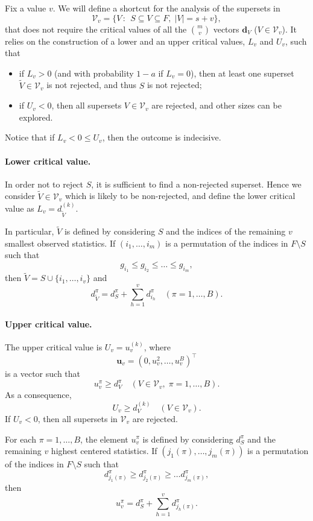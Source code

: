 \documentclass[11pt,a4paper,openright,twoside]{article}
\begin{document}
Fix a value $v$. We will define a shortcut for the analysis of the supersets in
\[\mathcal{V}_v=\{V\,:\,\;S\subseteq V\subseteq F,\; |V|=s+v\},\]
that does not require the critical values of all the $\binom{m}{v}$ vectors $\mathbf{d}_V$ ($V\in\mathcal{V}_v$). It relies on the construction of a lower and an upper critical values, $L_v$ and $U_v$, such that
\begin{itemize}
\item if $L_v> 0$ (and with probability $1-a$ if $L_v=0$), then at least one superset $\tilde{V}\in\mathcal{V}_v$ is not rejected, and thus $S$ is not rejected;
\item if $U_v<0$, then all supersets $V\in\mathcal{V}_v$ are rejected, and other sizes can be explored.
\end{itemize}
Notice that if $L_v< 0\leq U_v$, then the outcome is indecisive. 


\paragraph{Lower critical value.} In order not to reject $S$, it is sufficient to find a non-rejected superset. Hence we consider $\tilde{V}\in\mathcal{V}_v$ which is likely to be non-rejected, and define the lower critical value as $L_v=d_{\tilde{V}}^{(k)}$.

In particular, $\tilde{V}$ is defined by considering $S$ and the indices of the remaining $v$ smallest observed statistics. If $(i_1,\ldots,i_m)$ is a permutation of the indices in $F\setminus S$ such that
\[g_{i_1}\leq g_{i_2}\leq\ldots\leq g_{i_m},\]
then $\tilde{V}=S\cup \{i_1,\ldots,i_v\}$ and
\[d_{\tilde{V}}^\pi = d_S^\pi + \sum_{h=1}^v d_{i_h}^\pi\quad (\pi=1,\ldots,B).\]

\paragraph{Upper critical value.} The upper critical value is $U_v=u_v^{(k)}$, where
\[\mathbf{u}_v=(0,u_v^2,\ldots,u_v^B)^\top\]
is a vector such that
\[u_v^\pi\geq d_V^\pi\quad (V\in\mathcal{V}_v,\;\pi=1,\ldots,B).\]
As a consequence,
\[U_v \geq d_V^{(k)}\quad (V\in\mathcal{V}_v).\]
If $U_v<0$, then all supersets in $\mathcal{V}_v$ are rejected.

For each $\pi=1,\ldots,B$, the element $u_v^\pi$ is defined by considering $d_S^\pi$ and the remaining $v$ highest centered statistics. If $(j_1(\pi),\ldots,j_m(\pi))$ is a permutation of the indices in $F\setminus S$ such that
\[d_{j_1(\pi)}^\pi\geq d_{j_2(\pi)}^\pi\geq\ldots d_{j_m(\pi)}^\pi ,\]
then
\[u_v^\pi=d_S^\pi + \sum_{h=1}^v d_{j_h(\pi)}^\pi.\]
\end{document}

